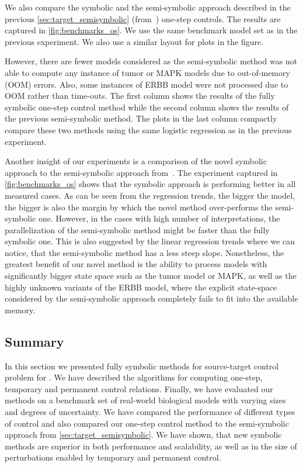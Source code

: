 We also compare the symbolic and the semi-symbolic approach described in the previous \autoref{sec:target_semisymbolic} (from~\cite{Brim2021}) one-step controls. The results are captured in \autoref{fig:benchmarks_os}. We use the same benchmark model set as in the previous experiment. We also use a similar layout for plots in the figure. 

However, there are fewer models considered as the semi-symbolic method was not able to compute any instance of tumor or MAPK models due to out-of-memory (OOM) errors. Also, some instances of ERBB model were not processed due to OOM rather than time-outs. The first column shows the results of the fully symbolic one-step control method while the second column shows the results of the previous semi-symbolic method. The plots in the last column compactly compare these two methods using the same logistic regression as in the previous experiment.



Another insight of our experiments is a comparison of the novel symbolic approach to the semi-symbolic approach from~\cite{Brim2021}. The experiment captured in \autoref{fig:benchmarks_os} shows that the symbolic approach is performing better in all measured cases. As can be seen from the regression trends, the bigger the model, the bigger is also the margin by which the novel method over-performs the semi-symbolic one. However, in the cases with high number of interpretations, the parallelization of the semi-symbolic method might be faster than the fully symbolic one. This is also suggested by the linear regression trends where we can notice, that the semi-symbolic method has a less steep slope. Nonetheless, the greatest benefit of our novel method is the ability to process models with significantly bigger state space such as the tumor model or MAPK, as well as the highly unknown variants of the ERBB model, where the explicit state-space considered by the semi-symbolic approach completely fails to fit into the available memory.

\subsection{Summary}
\label{s:discussion}


 In this section we presented fully symbolic methods for source-target control problem for . We have described the algorithms for computing one-step, temporary and permanent control relations. Finally, we have evaluated our methods on a benchmark set of real-world biological models with varying sizes and degrees of uncertainty. We have compared the performance of different types of control and also compared our one-step control method to the semi-symbolic approach from \autoref{sec:target_semisymbolic}. We have shown, that new symbolic methods are superior in both performance and scalability, as well as in the size of perturbations enabled by temporary and permanent control.

